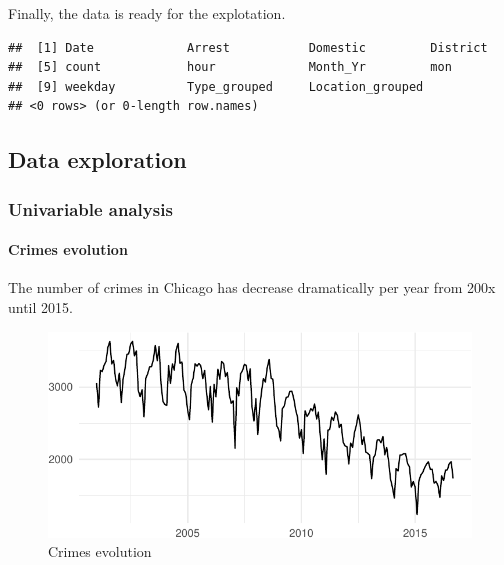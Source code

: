 \documentclass[]{article}
\newenvironment{Shaded}{\begin{snugshade}}{\end{snugshade}}
\newcommand{\KeywordTok}[1]{\textcolor[rgb]{0.13,0.29,0.53}{\textbf{{#1}}}}
\newcommand{\DecValTok}[1]{\textcolor[rgb]{0.00,0.00,0.81}{{#1}}}
\newcommand{\NormalTok}[1]{{#1}}
\let\oldparagraph\paragraph
\renewcommand{\paragraph}[1]{\oldparagraph{#1}\mbox{}}
\begin{document}
Finally, the data is ready for the explotation.

\begin{Shaded}
\end{Shaded}

\begin{verbatim}
##  [1] Date             Arrest           Domestic         District        
##  [5] count            hour             Month_Yr         mon             
##  [9] weekday          Type_grouped     Location_grouped
## <0 rows> (or 0-length row.names)
\end{verbatim}

\subsection{Data exploration}\label{data-exploration}

\subsubsection{Univariable analysis}\label{univariable-analysis}

\paragraph{Crimes evolution}\label{crimes-evolution}

The number of crimes in Chicago has decrease dramatically per year from
200x until 2015.

\begin{figure}[htbp]
\centering
\includegraphics{Assessment_1v6_files/figure-latex/fig-1.pdf}
\caption{Crimes evolution}
\end{figure}
\end{document}
